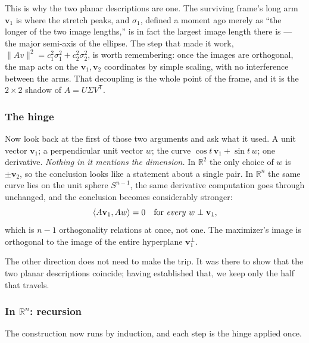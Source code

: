 \documentclass[11pt]{article}
\numberwithin{equation}{section}
\newcommand{\R}{\mathbb{R}}
\newcommand{\T}{^{\mathsf{T}}}
\newcommand{\ip}[2]{\langle #1, #2 \rangle}
\newcommand{\vv}[1]{\mathbf{v}_{#1}}
\theoremstyle{plainish}
\begin{document}
This is why the two planar descriptions are one. The surviving frame's long arm
$\vv1$ is where the stretch peaks, and $\sigma_1$, defined a moment ago merely as
``the longer of the two image lengths,'' is in fact the largest image length
there is --- the major semi-axis of the ellipse. The step that made it work,
$\|Av\|^2 = c_1^2\sigma_1^2 + c_2^2\sigma_2^2$, is worth remembering: once the
images are orthogonal, the map acts on the $\vv1,\vv2$ coordinates by simple
scaling, with no interference between the arms. That decoupling is the whole
point of the frame, and it is the $2\times 2$ shadow of $A = U\Sigma V\T$.

\subsubsection*{The hinge}

Now look back at the first of those two arguments and ask what it used. A unit
vector $\vv1$; a perpendicular unit vector $w$; the curve
$\cos t\,\vv1 + \sin t\,w$; one derivative. \emph{Nothing in it mentions the
dimension.} In $\R^2$ the only choice of $w$ is $\pm\vv2$, so the conclusion
looks like a statement about a single pair. In $\R^n$ the same curve lies on the
unit sphere $S^{n-1}$, the same derivative computation goes through unchanged,
and the conclusion becomes considerably stronger:
\begin{equation}\ip{A\vv1}{Aw} = 0 \quad\text{for \emph{every} } w \perp \vv1 ,
\end{equation}
which is $n-1$ orthogonality relations at once, not one. The maximizer's image
is orthogonal to the image of the entire hyperplane $\vv1^\perp$.

The other direction does not need to make the trip. It was there to show that
the two planar descriptions coincide; having established that, we keep only the
half that travels.

\subsubsection*{In \texorpdfstring{$\R^n$}{R\^{}n}: recursion}

The construction now runs by induction, and each step is the hinge applied once.
\end{document}
